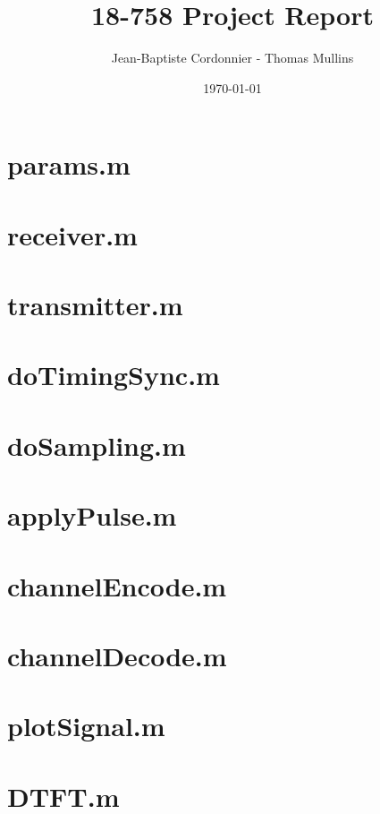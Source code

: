 \documentclass{article}
\newcommand{\file}[1]{\section{#1}}
\begin{document}
\title{18-758 Project Report}
\author{Jean-Baptiste Cordonnier - Thomas Mullins}
\date{\today}
\maketitle

\clearpage
\appendix
\file{params.m}
\file{receiver.m}
\file{transmitter.m}
\file{doTimingSync.m}
\file{doSampling.m}
\file{applyPulse.m}
\file{channelEncode.m}
\file{channelDecode.m}
\file{plotSignal.m}
\file{DTFT.m}
\end{document}
